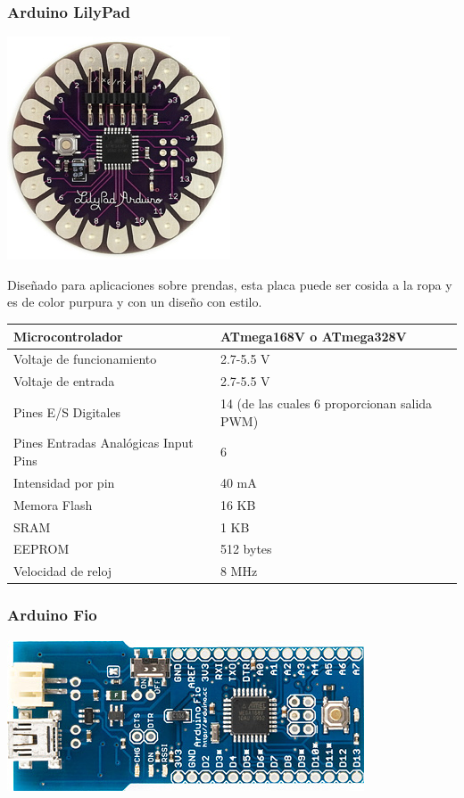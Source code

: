 \documentclass[12pt,a4papert,woside,openright,titlepage,final]{book}
\begin{document}
\subsubsection{Arduino LilyPad}

\includegraphics[scale=0.6]{LilyPad_3.jpg}

Diseñado para aplicaciones sobre prendas, esta placa puede ser cosida a la ropa
y es de color purpura y con un diseño con estilo. 

\begin{tabular}{||l | l ||}
\hline
\hline
Microcontrolador & ATmega168V o ATmega328V\\
\hline
Voltaje de funcionamiento & 2.7-5.5 V\\
\hline
Voltaje de entrada & 2.7-5.5 V\\
\hline
Pines E/S Digitales & 14 (de las cuales 6 proporcionan salida PWM)\\
\hline
Pines Entradas Analógicas Input Pins & 6\\
\hline
Intensidad por pin & 40 mA\\
\hline
Memora Flash & 16 KB \\
\hline
SRAM & 1 KB\\
\hline
EEPROM & 512 bytes\\
\hline
Velocidad de reloj & 8 MHz\\
\hline
\hline
\end{tabular}


\subsubsection{Arduino Fio}

\includegraphics[scale=0.6]{ArduinoFio.jpg}
\end{document}
